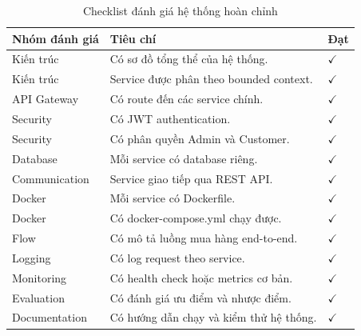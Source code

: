 \documentclass[../main.tex]{subfiles}
\begin{document}
\begin{table}[H]
    \centering
    \caption{Checklist đánh giá hệ thống hoàn chỉnh}
    \label{tab:chapter4-checklist}
    \begin{tabular}{|p{}|p{}|p{}|}
        \hline
        \rowcolor{primary!35}
        \textbf{Nhóm đánh giá} & \textbf{Tiêu chí} & \textbf{Đạt} \\
        \hline
        Kiến trúc & Có sơ đồ tổng thể của hệ thống. & $\checkmark$ \\
        \hline
        Kiến trúc & Service được phân theo bounded context. & $\checkmark$ \\
        \hline
        API Gateway & Có route đến các service chính. & $\checkmark$ \\
        \hline
        Security & Có JWT authentication. & $\checkmark$ \\
        \hline
        Security & Có phân quyền Admin và Customer. & $\checkmark$ \\
        \hline
        Database & Mỗi service có database riêng. & $\checkmark$ \\
        \hline
        Communication & Service giao tiếp qua REST API. & $\checkmark$ \\
        \hline
        Docker & Mỗi service có Dockerfile. & $\checkmark$ \\
        \hline
        Docker & Có docker-compose.yml chạy được. & $\checkmark$ \\
        \hline
        Flow & Có mô tả luồng mua hàng end-to-end. & $\checkmark$ \\
        \hline
        Logging & Có log request theo service. & $\checkmark$ \\
        \hline
        Monitoring & Có health check hoặc metrics cơ bản. & $\checkmark$ \\
        \hline
        Evaluation & Có đánh giá ưu điểm và nhược điểm. & $\checkmark$ \\
        \hline
        Documentation & Có hướng dẫn chạy và kiểm thử hệ thống. & $\checkmark$ \\
        \hline
    \end{tabular}
\end{table}
\end{document}
